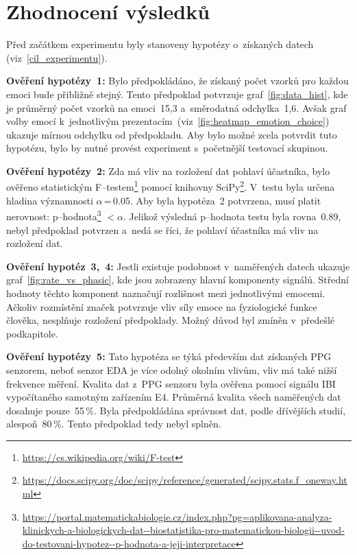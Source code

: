     \section{Zhodnocení výsledků}
    \label{zhodnoceni}
    Před začátkem experimentu byly stanoveny hypotézy o~získaných datech (viz~\ref{cil_experimentu}).
    
    \vspace{3mm}
    
    \textbf{Ověření hypotézy~1:} Bylo předpokládáno, že získaný počet vzorků pro každou emoci bude přibližně stejný. Tento předpoklad potvrzuje graf~\ref{fig:data_hist}, kde je průměrný počet vzorků na emoci~15,3 a~směrodatná odchylka~1,6. Avšak graf volby emocí k~jednotlivým prezentacím~(viz~\ref{fig:heatmap_emotion_choice}) ukazuje mírnou odchylku od předpokladu. Aby bylo možné zcela potvrdit tuto hypotézu, bylo by nutné provést experiment s~početnější testovací skupinou.
    
    \vspace{3mm}
    
    \textbf{Ověření hypotézy~2:} Zda má vliv na rozložení dat pohlaví účastníka, bylo ověřeno statistickým F--testem\footnote{\url{https://cs.wikipedia.org/wiki/F-test}} pomocí knihovny SciPy\footnote{\url{https://docs.scipy.org/doc/scipy/reference/generated/scipy.stats.f_oneway.html}}. V~testu byla určena hladina významnosti $\alpha$\,=\,0.05. Aby byla hypotéza~2 potvrzena, musí platit nerovnost: p--hodnota\footnote{\url{https://portal.matematickabiologie.cz/index.php?pg=aplikovana-analyza-klinickych-a-biologickych-dat--biostatistika-pro-matematickou-biologii--uvod-do-testovani-hypotez--p-hodnota-a-jeji-interpretace}} $< \alpha$.  Jelikož výsledná p--hodnota testu byla rovna~0.89, nebyl předpoklad potvrzen a~nedá se říci, že pohlaví účastníka má vliv na rozložení dat. 
    
    \vspace{3mm}
    
    \textbf{Ověření hypotéz~3,~4:} Jestli existuje podobnost v~naměřených datech ukazuje graf~\ref{fig:rate_vs_phasic}, kde jsou zobrazeny hlavní komponenty signálů. Střední hodnoty těchto komponent naznačují rozlišnost mezi jednotlivými emocemi. Ačkoliv rozmístění značek potvrzuje vliv síly emoce na fyziologické funkce člověka, nesplňuje rozložení předpoklady. Možný důvod byl zmíněn v~předešlé podkapitole.
    
    \vspace{3mm}
    
    \textbf{Ověření hypotézy~5:} Tato hypotéza se týká především dat získaných PPG senzorem, neboť senzor EDA je více odolný okolním vlivům, vliv má také nižší frekvence měření. Kvalita dat z~PPG senzoru byla ověřena pomocí signálu IBI vypočítaného samotným zařízením E4. Průměrná kvalita všech naměřených dat dosahuje pouze~55\,\%. Byla předpokládána správnost dat, podle dřívějších studií, alespoň~80\,\%. Tento předpoklad tedy nebyl splněn. 
    
